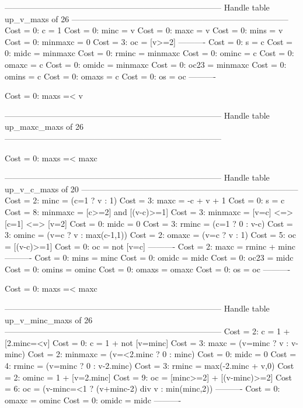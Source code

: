 --------------------------------------------------------------------------------
Handle table up_v_maxs of 26
--------------------------------------------------------------------------------
Cost =  0:  c       = 1
Cost =  0:  minc    = v
Cost =  0:  maxc    = v
Cost =  0:  mins    = v
Cost =  0:  minmaxc = 0
Cost =  3:  oc      = [v>=2]
----------
Cost =  0:  s       = c
Cost =  0:  midc    = minmaxc
Cost =  0:  rminc   = minmaxc
Cost =  0:  ominc   = c
Cost =  0:  omaxc   = c
Cost =  0:  omidc   = minmaxc
Cost =  0:  oc23    = minmaxc
Cost =  0:  omins   = c
Cost =  0:  omaxs   = c
Cost =  0:  os      = oc
----------

Cost =  0:  maxs =< v

--------------------------------------------------------------------------------
Handle table up_maxc_maxs of 26
--------------------------------------------------------------------------------

Cost =  0:  maxs =< maxc

--------------------------------------------------------------------------------
Handle table up_v_c_maxs of 20
--------------------------------------------------------------------------------
Cost =  2:  minc    = (c=1 ? v : 1)
Cost =  3:  maxc    = -c + v + 1
Cost =  0:  s       = c
Cost =  8:  minmaxc = [c>=2] and [(v-c)>=1]
Cost =  3:  minmaxc = [v=c] <=> [c=1] <=> [v=2]
Cost =  0:  midc    = 0
Cost =  3:  rminc   = (c=1 ? 0 : v-c)
Cost =  3:  ominc   = (v=c ? v : max(c-1,1))
Cost =  2:  omaxc   = (v=c ? v : 1)
Cost =  5:  oc      = [(v-c)>=1]
Cost =  0:  oc      = not [v=c]
----------
Cost =  2:  maxc    = rminc + minc
----------
Cost =  0:  mins    = minc
Cost =  0:  omidc   = midc
Cost =  0:  oc23    = midc
Cost =  0:  omins   = ominc
Cost =  0:  omaxs   = omaxc
Cost =  0:  os      = oc
----------

Cost =  0:  maxs =< maxc

--------------------------------------------------------------------------------
Handle table up_v_minc_maxs of 26
--------------------------------------------------------------------------------
Cost =  2:  c       = 1 + [2.minc=<v]
Cost =  0:  c       = 1 + not [v=minc]
Cost =  3:  maxc    = (v=minc ? v : v-minc)
Cost =  2:  minmaxc = (v=<2.minc ? 0 : minc)
Cost =  0:  midc    = 0
Cost =  4:  rminc   = (v=minc ? 0 : v-2.minc)
Cost =  3:  rminc   = max(-2.minc + v,0)
Cost =  2:  ominc   = 1 + [v=2.minc]
Cost =  9:  oc      = [minc>=2] + [(v-minc)>=2]
Cost =  6:  oc      = (v-minc=<1 ? (v+minc-2) div v : min(minc,2))
----------
Cost =  0:  omaxc   = ominc
Cost =  0:  omidc   = midc
----------

